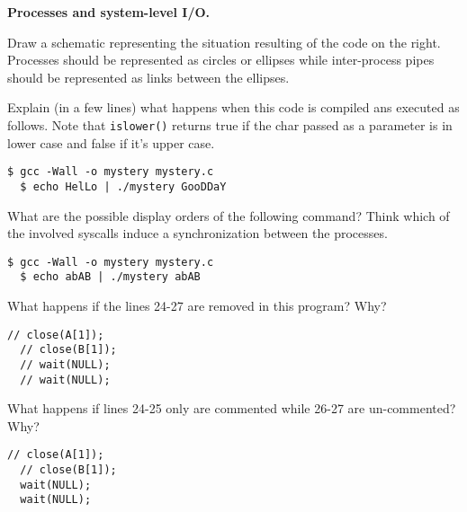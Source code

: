 \documentclass[10pt]{article}\usepackage[enonce]{exemptty}
\newenvironment{Live}%
    {\color{RoyalPurple}}%
    {\color{black}}
\begin{document}
\bigskip
\noindent
\begin{minipage}[t]{.5\linewidth}
  \Exercise \textbf{Processes and system-level I/O.}

  \Question Draw a schematic representing the situation resulting of the code on
  the right. Processes should be represented as circles or ellipses while
  inter-process pipes should be represented as links between the ellipses.

  \Question Explain (in a few lines) what happens when this code is compiled ans
  executed as follows. Note that \texttt{islower()} returns true if the char
  passed as a parameter is in lower case and false if it's upper case.
\begin{Verbatim}[gobble=2,numbers=none]
  $ gcc -Wall -o mystery mystery.c
  $ echo HelLo | ./mystery GooDDaY
\end{Verbatim}

\Question What are the possible display orders of the following command? Think
which of the involved syscalls induce a synchronization between the processes.
\begin{Verbatim}[gobble=2,numbers=none]
  $ gcc -Wall -o mystery mystery.c
  $ echo abAB | ./mystery abAB
\end{Verbatim}

\Question What happens if the lines 24-27 are removed in this program? Why?
\begin{Verbatim}[gobble=2,firstnumber=24]
  // close(A[1]); 
  // close(B[1]);
  // wait(NULL);
  // wait(NULL);
\end{Verbatim}

\begin{Live}
  \Question What happens if lines 24-25 only are commented while 26-27 are
  un-commented? Why?
\begin{Verbatim}[gobble=2,firstnumber=24]
  // close(A[1]); 
  // close(B[1]);
  wait(NULL);
  wait(NULL);
\end{Verbatim}
\end{Live}

\end{minipage}\hfill\begin{minipage}[t]{.4\linewidth}
\end{minipage}
\end{document}
